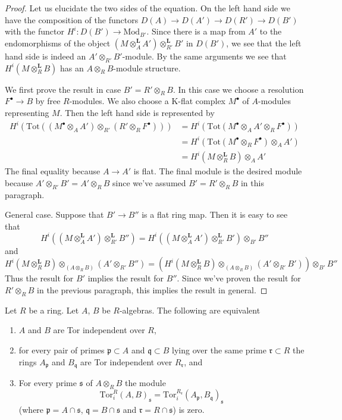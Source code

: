 \begin{proof}
Let us elucidate the two sides of the equation. On the left hand side
we have the composition of the functors
$D(A) \to D(A') \to D(R') \to D(B')$ with the functor
$H^i : D(B') \to \text{Mod}_{B'}$. Since there is
a map from $A'$ to the endomorphisms of the object
$(M \otimes_A^\mathbf{L} A') \otimes_{R'}^\mathbf{L} B'$
in $D(B')$, we see that the left hand side is indeed
an $A' \otimes_{R'} B'$-module. By the same arguments
we see that $H^i(M \otimes_R^\mathbf{L} B)$
has an $A \otimes_R B$-module structure.

\medskip\noindent
We first prove the result in case $B' = R' \otimes_R B$.
In this case we choose a resolution $F^\bullet \to B$
by free $R$-modules. We also choose a K-flat complex
$M^\bullet$ of $A$-modules representing $M$.
Then the left hand side is represented by
\begin{align*}
H^i(\text{Tot}((M^\bullet \otimes_A A') \otimes_{R'} (R' \otimes_R F^\bullet)))
& =
H^i(\text{Tot}(M^\bullet \otimes_A A' \otimes_R F^\bullet)) \\
& =
H^i(\text{Tot}(M^\bullet \otimes_R F^\bullet) \otimes_A A') \\
& =
H^i(M \otimes_R^\mathbf{L} B) \otimes_A A'
\end{align*}
The final equality because $A \to A'$ is flat. The final module
is the desired module because $A' \otimes_{R'} B' = A' \otimes_R B$
since we've assumed $B' = R' \otimes_R B$ in this paragraph.

\medskip\noindent
General case. Suppose that $B' \to B''$ is a flat ring map.
Then it is easy to see that
$$
H^i((M \otimes_A^\mathbf{L} A') \otimes_{R'}^\mathbf{L} B'') =
H^i((M \otimes_A^\mathbf{L} A') \otimes_{R'}^\mathbf{L} B')
\otimes_{B'} B''
$$
and
$$
H^i(M \otimes_R^\mathbf{L} B) \otimes_{(A \otimes_R B)} (A' \otimes_{R'} B'')
=
\left(
H^i(M \otimes_R^\mathbf{L} B) \otimes_{(A \otimes_R B)} (A' \otimes_{R'} B')
\right) \otimes_{B'} B''
$$
Thus the result for $B'$ implies the result for $B''$. Since we've
proven the result for $R' \otimes_R B$ in the previous paragraph,
this implies the result in general.
\end{proof}

\begin{lemma}
\label{lemma-tor-independent}
Let $R$ be a ring. Let $A$, $B$ be $R$-algebras. The following are equivalent
\begin{enumerate}
\item $A$ and $B$ are Tor independent over $R$,
\item for every pair of primes $\mathfrak p \subset A$ and
$\mathfrak q \subset B$ lying over the same prime $\mathfrak r \subset R$
the rings $A_\mathfrak p$ and $B_\mathfrak q$ are Tor independent over
$R_\mathfrak r$, and
\item For every prime $\mathfrak s$ of $A \otimes_R B$ the module
$$
\text{Tor}_i^R(A, B)_\mathfrak s =
\text{Tor}_i^{R_\mathfrak r}(A_\mathfrak p, B_\mathfrak q)_\mathfrak s
$$
(where $\mathfrak p = A \cap \mathfrak s$, $\mathfrak q = B \cap \mathfrak s$
and $\mathfrak r = R \cap \mathfrak s$) is zero.
\end{enumerate}
\end{lemma}

